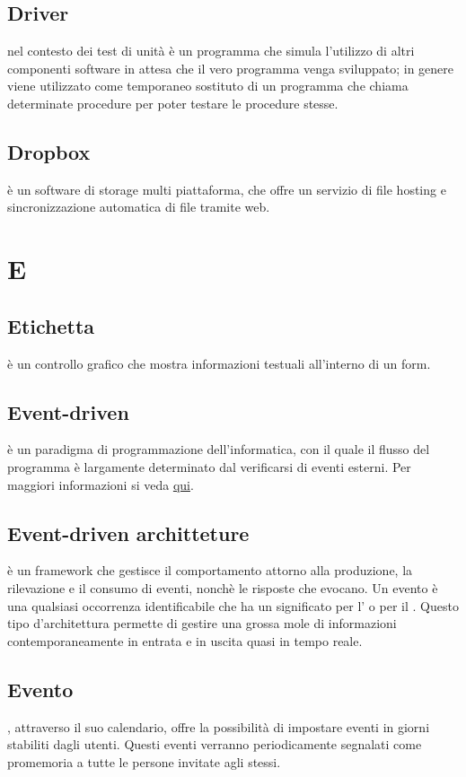 \documentclass[12pt,a4paper]{article}
\begin{document}
\subsection{Driver} 
 nel contesto dei test di unità è un programma che simula l'utilizzo di altri componenti software in attesa che il vero programma venga sviluppato; in genere viene utilizzato come temporaneo sostituto di un programma che chiama determinate procedure per poter testare le procedure stesse.

\subsection{Dropbox} 
 è un software di  storage multi piattaforma, che offre un servizio di file hosting e sincronizzazione automatica di file tramite web.


\newpage

\section{E}


\subsection{Etichetta} 
 è un controllo grafico che mostra informazioni testuali all'interno di un form.

\subsection{Event-driven} 
 è un paradigma di programmazione dell'informatica, con il quale il flusso del programma è largamente determinato dal verificarsi di eventi esterni. Per maggiori informazioni si veda \href{https://it.wikipedia.org/wiki/Programmazione_a_eventi}{qui}.

\subsection{Event-driven architteture} 
è un framework che gestisce il comportamento attorno alla produzione, la rilevazione e il consumo di eventi, nonchè le risposte che evocano. Un evento è una qualsiasi occorrenza identificabile che ha un significato per l' o per il . Questo tipo d'architettura  permette di gestire  una grossa mole di informazioni contemporaneamente  in entrata e in uscita quasi in tempo reale.

\subsection{Evento} 
 , attraverso il suo calendario, offre la possibilità di impostare eventi in giorni stabiliti dagli utenti. Questi eventi verranno periodicamente segnalati come promemoria a tutte le persone invitate agli stessi.
\end{document}
